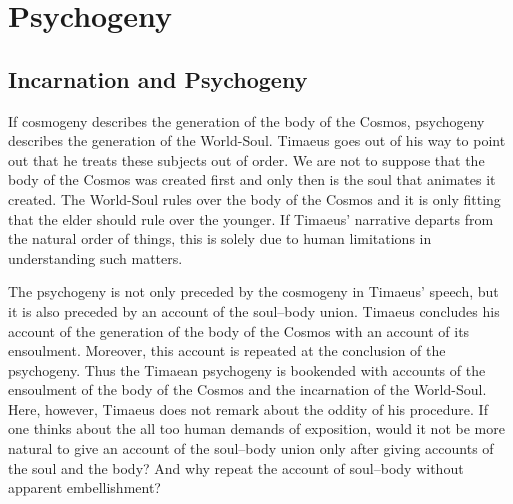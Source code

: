 
\chapter{Psychogeny} %
\label{cha:psychogeny}

\section{Incarnation and Psychogeny} %
\label{sec:embodiment_and_psychogeny}

If cosmogeny describes the generation of the body of the Cosmos, psychogeny describes the generation of the World-Soul. Timaeus goes out of his way to point out that he treats these subjects out of order. We are not to suppose that the body of the Cosmos was created first and only then is the soul that animates it created. The World-Soul rules over the body of the Cosmos and it is only fitting that the elder should rule over the younger. If Timaeus' narrative departs from the natural order of things, this is solely due to human limitations in understanding such matters.

The psychogeny is not only preceded by the cosmogeny in Timaeus' speech, but it is also preceded by an account of the soul--body union. Timaeus concludes his account of the generation of the body of the Cosmos with an account of its ensoulment. Moreover, this account is repeated at the conclusion of the psychogeny. Thus the Timaean psychogeny is bookended with accounts of the ensoulment of the body of the Cosmos and the incarnation of the World-Soul. Here, however, Timaeus does not remark about the oddity of his procedure. If one thinks about the all too human demands of exposition, would it not be more natural to give an account of the soul--body union only after giving accounts of the soul and the body? And why repeat the account of soul--body without apparent embellishment? 

